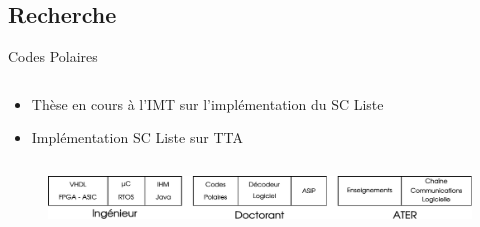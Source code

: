 \documentclass[t,compress,mathserif,12pt,xcolor=dvipsnames]{beamer}
\begin{document}
\subsection{Recherche}
\begin{frame}[t]{Codes Polaires}
  \begin{minipage}[t][5.0cm][t]{\textwidth}
    \begin{columns}
      \begin{column}{0.63\textwidth}
        \vspace{-30pt}
        \begin{itemize}
          \item Thèse en cours à l'IMT sur l'implémentation du SC Liste
          \item Implémentation SC Liste sur TTA
        \end{itemize}
      \end{column}
      \begin{column}{0.04\textwidth}

      \end{column}
      \begin{column}{0.33\textwidth}
      \end{column}
    \end{columns}
  \end{minipage}
  \begin{figure}[htp]
    \centering
    \includegraphics[width=\textwidth]{fig/frise}
  \end{figure}

\end{frame}
\end{document}
